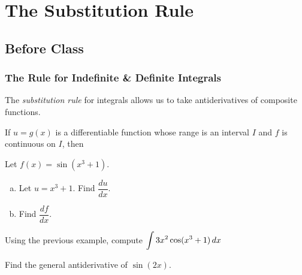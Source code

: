 \documentclass[notes]{subfiles}
\begin{document}
	\fancyhead[LO,RE]{\bfseries \currentname}
	\fancyfoot[C]{{}}
	\fancyfoot[RO,LE]{\large \thepage}	%

\section*{The Substitution Rule}\label{cs45}
	\subsection*{Before Class}
	\subsubsection*{The Rule for Indefinite \& Definite Integrals}
		The \emph{substitution rule} for integrals allows us to take antiderivatives of composite functions.
		\begin{thm}
			If $u = g(x)$ is a differentiable function whose range is an interval $I$ and $f$ is continuous on $I$, then
		\end{thm}
		 	
		\begin{ex}
		 	  Let $f(x) = \sin (x^3 + 1)$.  
		 	  \begin{enumerate}[(a)]
		 	  	\item Let $u = x^3 + 1$.  Find $\dfrac{du}{dx}$.
		 	  		
		 	  	\item Find $\dfrac{df}{dx}$.
		 	  		
		 	  \end{enumerate}
		\end{ex}
			
		\begin{ex}
			Using the previous example, compute $\displaystyle \int 3x^2\cos(x^3+1)\, dx$
		\end{ex}
			\vs{1}
			\newpage
			
		\begin{ex}
			Find the general antiderivative of $\sin (2x)$.
		\end{ex}
\end{document}
